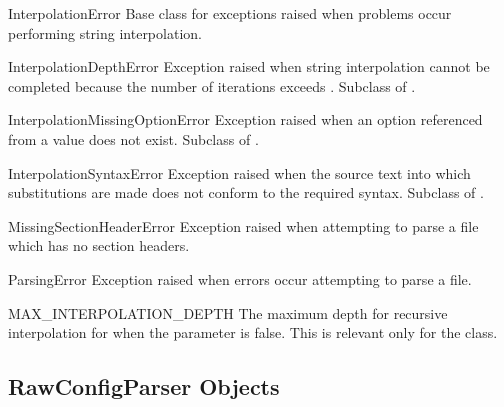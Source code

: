 \begin{excdesc}{InterpolationError}
Base class for exceptions raised when problems occur performing string
interpolation.
\end{excdesc}

\begin{excdesc}{InterpolationDepthError}
Exception raised when string interpolation cannot be completed because
the number of iterations exceeds .
Subclass of .
\end{excdesc}

\begin{excdesc}{InterpolationMissingOptionError}
Exception raised when an option referenced from a value does not exist.
Subclass of .
\end{excdesc}

\begin{excdesc}{InterpolationSyntaxError}
Exception raised when the source text into which substitutions are
made does not conform to the required syntax.
Subclass of .
\end{excdesc}

\begin{excdesc}{MissingSectionHeaderError}
Exception raised when attempting to parse a file which has no section
headers.
\end{excdesc}

\begin{excdesc}{ParsingError}
Exception raised when errors occur attempting to parse a file.
\end{excdesc}

\begin{datadesc}{MAX_INTERPOLATION_DEPTH}
The maximum depth for recursive interpolation for  when
the  parameter is false.  This is relevant only for the
 class.
\end{datadesc}


\begin{seealso}
\end{seealso}


\subsection{RawConfigParser Objects \label{RawConfigParser-objects}}

